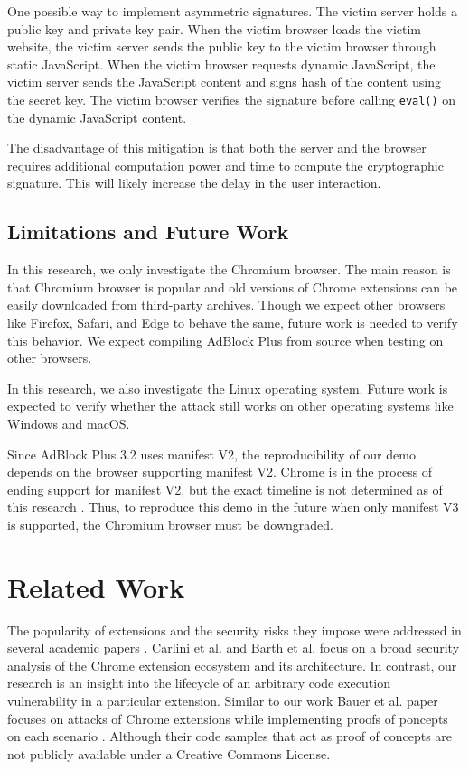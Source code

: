 \documentclass[conference]{IEEEtran}
\begin{document}
One possible way to implement asymmetric signatures. The victim server holds a public key and private key pair. When the victim browser loads the victim website, the victim server sends the public key to the victim browser through static JavaScript. When the victim browser requests dynamic JavaScript, the victim server sends the JavaScript content and signs hash of the content using the secret key. The victim browser verifies the signature before calling \lstinline{eval()} on the dynamic JavaScript content.

The disadvantage of this mitigation is that both the server and the browser requires additional computation power and time to compute the cryptographic signature. This will likely increase the delay in the user interaction.

\subsection{Limitations and Future Work}

In this research, we only investigate the Chromium browser. The main reason is that Chromium browser is popular and old versions of Chrome extensions can be easily downloaded from third-party archives. Though we expect other browsers like Firefox, Safari, and Edge to behave the same, future work is needed to verify this behavior. We expect compiling AdBlock Plus from source when testing on other browsers.

In this research, we also investigate the Linux operating system. Future work is expected to verify whether the attack still works on other operating systems like Windows and macOS.

Since AdBlock Plus 3.2 uses manifest V2, the reproducibility of our demo depends on the browser supporting manifest V2. Chrome is in the process of ending support for manifest V2, but the exact timeline is not determined as of this research \cite{chrome_manifest_v2}. Thus, to reproduce this demo in the future when only manifest V3 is supported, the Chromium browser must be downgraded.

\section{Related Work}
The popularity of extensions and the security risks they impose were addressed in several academic papers \cite{carlini2012evaluation} \cite{barth2010protecting} \cite{bauer2014analyzing}. Carlini et al. \cite{carlini2012evaluation} and Barth et al. \cite{barth2010protecting} focus on a broad security analysis of the Chrome extension ecosystem and its architecture.  In contrast, our research is an insight into the lifecycle of an arbitrary code execution vulnerability in a particular extension.
Similar to our work Bauer et al. paper focuses on attacks of Chrome extensions while implementing proofs of poncepts on each scenario \cite{bauer2014analyzing}. Although their code samples that act as proof of concepts are not publicly available under a Creative Commons License. 
\end{document}
